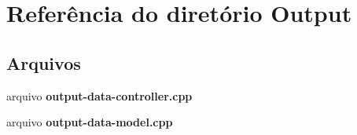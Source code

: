 \section{Referência do diretório Output}
\label{dir_81210ff9144339c758eca1d8b91a5f4a}
\subsection*{Arquivos}
\begin{DoxyCompactItemize}
\item 
arquivo {\bf output-\/data-\/controller.\+cpp}
\item 
arquivo {\bf output-\/data-\/model.\+cpp}
\end{DoxyCompactItemize}
